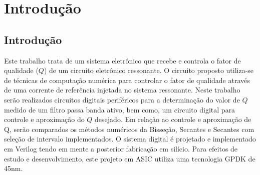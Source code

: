 


\usepackage{config/customizacoes}







\frenchspacing 
\imprimircapa
\imprimirfolhaderosto*

% 

% 




% 






% 

\textual

\part{Introdução}

\chapter{Introdução}

% 

Este trabalho trata de um sistema eletrônico que recebe e controla o fator de qualidade ($Q$) de um circuito eletrônico ressonante. O circuito proposto utiliza-se de técnicas de computação numérica para controlar o fator de qualidade através de uma corrente de referência injetada no sistema ressonante. Neste trabalho serão realizados circuitos digitais periféricos para a determinação do valor de $Q$ medido de um filtro passa banda ativo, bem como, um circuito digital para controle e aproximação do $Q$ desejado. Em relação ao controle e aproximação de Q, serão comparados os métodos numéricos da Bisseção, Secantes e Secantes com seleção de intervalo implementados. O sistema digital é projetado e implementado em Verilog tendo em mente a posterior fabricação em silício. Para efeitos de estudo e desenvolvimento, este projeto em ASIC utiliza uma tecnologia GPDK de 45nm.


